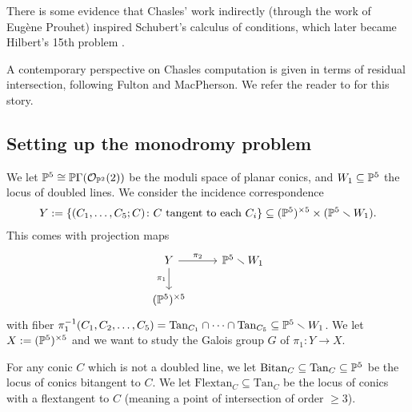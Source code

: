 \documentclass[11pt]{amsart}
\let\til\widetilde
\providecommand{\Bitan}{\mathrm{Bitan}}
\providecommand{\Flextan}{\mathrm{Flextan}}
\providecommand{\Tan}{\mathrm{Tan}}
\begin{document}
\begin{remark} There is some evidence that Chasles' work indirectly (through the work of Eugène Prouhet) inspired Schubert's calculus of conditions, which later became Hilbert's 15th problem \cite[p.~121]{Kleiman-Chasles}.
\end{remark}

A contemporary perspective on Chasles computation is given in terms of residual intersection, following Fulton and MacPherson. We refer the reader to \cite[13.5.5]{3264} for this story.


\subsection{Setting up the monodromy problem}

We let $\P^5 \cong \P\Gamma(\O_{\P^2}(2))$ be the moduli space of planar conics, and $W_1 \subseteq \P^5$ the locus of doubled lines. We consider the incidence correspondence
\begin{align*}
    Y := \left\{ (C_1, \ldots, C_5;C) \colon C \text{ tangent to each }C_i \right\}\subseteq (\P^5)^{\times 5} \times (\P^5 \minus W_1).
\end{align*}
This comes with projection maps
\[ \begin{tikzcd}
    Y\dar["\pi_1" left]\rar["\pi_2" above] & \P^5\minus W_1\\
    (\P^5)^{\times 5} &
\end{tikzcd} \]
with fiber $\pi_1^{-1}(C_1,C_2, \ldots, C_5) = \Tan_{C_1}\cap \cdots \cap \Tan_{C_5} \subseteq \P^5 \minus W_1$. We let $X := (\P^5)^{\times5}$ and we want to study the Galois group $G$ of $\pi_1 \colon Y \to X$.


\begin{notation} 
For any conic $C$ which is not a doubled line, we let $\Bitan_C \subseteq \Tan_C \subseteq \P^5$ be the locus of conics bitangent to $C$. We let $\Flextan_C \subseteq \Tan_C$ be the locus of conics with a flextangent to  $C$ (meaning a point of intersection of order $\ge 3$).
\end{notation}
\end{document}

